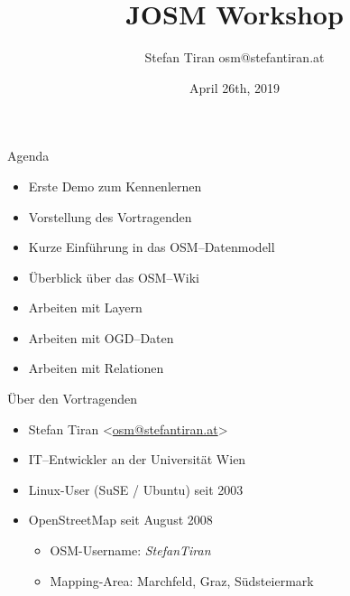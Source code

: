 \documentclass{beamer}
\title{JOSM Workshop}
\author{Stefan Tiran  osm@stefantiran.at}
\date{April 26th, 2019}
\begin{document}
\begin{frame}{Agenda}
  \begin{itemize}
    \item Erste Demo zum Kennenlernen
    \item Vorstellung des Vortragenden
    \item Kurze Einführung in das OSM--Datenmodell
    \item Überblick über das OSM--Wiki
    \item Arbeiten mit Layern
    \item Arbeiten mit OGD--Daten
    \item Arbeiten mit Relationen
  \end{itemize}
\end{frame}

\begin{frame}{Über den Vortragenden}

  \begin{itemize}
    \item Stefan Tiran \textless \href{mailto:osm@stefantiran.at}{osm@stefantiran.at}\textgreater
    \item IT--Entwickler an der Universität Wien
    \item Linux-User (SuSE / Ubuntu) seit 2003
    \item OpenStreetMap seit August 2008
    \begin{itemize}
      \item OSM-Username: \emph{StefanTiran}
      \item Mapping-Area: Marchfeld, Graz, Südsteiermark
    \end{itemize}
  \end{itemize}
\end{frame}
\end{document}
